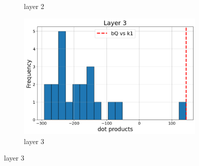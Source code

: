 \documentclass[11pt]{article}
\begin{document}
\begin{figure}[t]
\begin{subfigure}[t]{0.24\textwidth}
    \caption{layer 2}
  \end{subfigure}\hfill
  \begin{subfigure}[t]{0.24\textwidth}
    \centering
    \includegraphics[width=1.4\columnwidth]{figures/obs1_appendix/obs1_layer3.png}
    \caption{layer 3}
  \end{subfigure}\hfill
    \vspace{2mm}


\end{figure}
\end{document}
